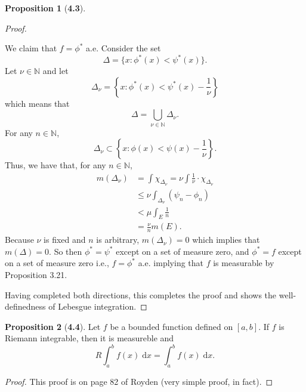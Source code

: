 \documentclass[12pt]{article}
\newcommand{\N}{\mathbb{N}}
\newcommand{\dif}{\; \mathrm{d}}
\theoremstyle{definition}
\newtheorem*{prop}{Proposition}
\begin{document}
\begin{prop}[\textbf{4.3}]
\begin{proof}
\begin{enumerate}
      We claim that \( f = \phi^{*} \) a.e. Consider the set
        \[
          \Delta = \{ x: \phi^{*}(x) < \psi^{*}(x) \}.
        \]
      Let \( \nu \in \N \) and let 
        \[
            \Delta_{\nu} = \left\{ x: \phi^{*}(x) < \psi^{*}(x) - \frac{1}{\nu} \right\}
        \]
      which means that 
        \[
            \Delta = \bigcup_{\nu \in \N} \Delta_{\nu}.
        \]
      For any \( n \in \N \),
        \[
          \Delta_{\nu} \subset \left\{ x: \phi(x) < \psi(x) - \frac{1}{\nu} \right\}.
        \]
      Thus, we have that, for any \( n \in \N \),
        \begin{align*}
          m \left( \Delta_{\nu} \right) &= \int \chi_{\Delta_{\nu}} = \nu \int \frac{1}{\nu} \cdot \chi_{\Delta_{\nu}} \\
          &\leq \nu \int_{\Delta_{\nu}} \left( \psi_n - \phi_n \right) \\
          &< \mu \int_{E} \frac{1}{n} \\
          &= \frac{\nu}{n} m(E).
        \end{align*}
      Because \( \nu \) is fixed and \( n \) is arbitrary, \( \displaystyle m(\Delta_{\nu}) = 0 \) which implies that \( \displaystyle m(\Delta) = 0 \). So then \( \phi^{*} = \psi^{*} \) except on a set of measure zero, and \( \phi^{*} = f \) except on a set of measure zero i.e., \( f = \phi^{*} \) a.e. implying that \( f \) is measurable by Proposition 3.21.
  \end{enumerate}
  Having completed both directions, this completes the proof and shows the well-definedness of Lebesgue integration. 
\end{proof}
\end{prop}

\begin{prop}[\textbf{4.4}] Let \( f \) be a bounded function defined on \( [a,b] \). If \( f \) is Riemann integrable, then it is measureble and 
    \[
        R \int_{a}^{b} f(x) \dif x = \int_{a}^{b} f(x) \dif x.
    \]

    \begin{proof}
      This proof is on page 82 of Royden (very simple proof, in fact).
    \end{proof}
  
\end{prop}
\end{document}

